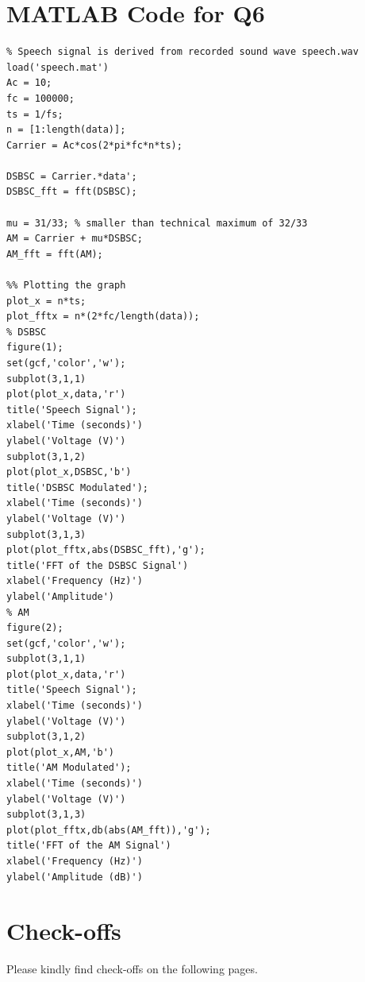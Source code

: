 \documentclass[11pt]{article}
\begin{document}
\section*{MATLAB Code for Q6}
\begin{lstlisting}[frame=single]
 % Plotting for Q6 Comm Sys
% Speech signal is derived from recorded sound wave speech.wav
load('speech.mat')
Ac = 10;
fc = 100000;
ts = 1/fs;
n = [1:length(data)];
Carrier = Ac*cos(2*pi*fc*n*ts);

DSBSC = Carrier.*data';
DSBSC_fft = fft(DSBSC);

mu = 31/33; % smaller than technical maximum of 32/33
AM = Carrier + mu*DSBSC;
AM_fft = fft(AM);

%% Plotting the graph
plot_x = n*ts;
plot_fftx = n*(2*fc/length(data));
% DSBSC
figure(1);
set(gcf,'color','w');
subplot(3,1,1)
plot(plot_x,data,'r')
title('Speech Signal');
xlabel('Time (seconds)')
ylabel('Voltage (V)')
subplot(3,1,2)
plot(plot_x,DSBSC,'b')
title('DSBSC Modulated');
xlabel('Time (seconds)')
ylabel('Voltage (V)')
subplot(3,1,3)
plot(plot_fftx,abs(DSBSC_fft),'g');
title('FFT of the DSBSC Signal')
xlabel('Frequency (Hz)')
ylabel('Amplitude')
% AM
figure(2);
set(gcf,'color','w');
subplot(3,1,1)
plot(plot_x,data,'r')
title('Speech Signal');
xlabel('Time (seconds)')
ylabel('Voltage (V)')
subplot(3,1,2)
plot(plot_x,AM,'b')
title('AM Modulated');
xlabel('Time (seconds)')
ylabel('Voltage (V)')
subplot(3,1,3)
plot(plot_fftx,db(abs(AM_fft)),'g');
title('FFT of the AM Signal')
xlabel('Frequency (Hz)')
ylabel('Amplitude (dB)')
\end{lstlisting}

\section*{Check-offs}
Please kindly find check-offs on the following pages.

\end{document}
